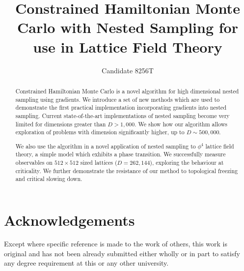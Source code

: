 \documentclass[aps,prd,reprint,preprintnumbers,showpacs,floatfix,nofootinbib,superscript address]{revtex4-2}
\begin{document}
\title{Constrained Hamiltonian Monte Carlo with Nested Sampling for use in Lattice Field Theory}

\author{Candidate 8256T}

\begin{abstract}
     Constrained Hamiltonian Monte Carlo is a novel algorithm for high dimensional nested sampling using gradients.
     We introduce a set of new methods which are used to demonstrate the first
     practical implementation incorporating gradients into nested sampling.
     Current state-of-the-art implementations of nested sampling become very limited for dimensions greater
     than $D > 1,000$.
     We show how our algorithm allows exploration of problems with dimension significantly higher, up to $D \sim 500,000$.

     We also use the algorithm in a novel application of nested sampling to $\phi^4$ lattice field theory,
     a simple model which exhibits a phase transition.
     We successfully measure observables on $512 \times 512$ sized lattices ($D=262,144$), exploring the behaviour at
     criticality.
     We further demonstrate the resistance of our method to topological freezing and critical slowing down.
\end{abstract}

\maketitle





















\section*{Acknowledgements}
Except where specific reference is made to the work of others, this work is original and has not been already
submitted either wholly or in part to satisfy any degree requirement at this or any other university.
\end{document}
